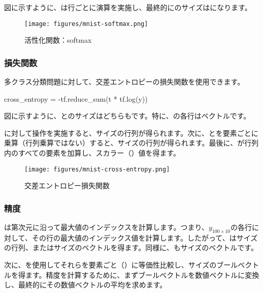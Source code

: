\begin{content}
図に示すように、は行ごとに演算を実施し、最終的にのサイズは\code{[100, 10]}になります。

\begin{figure}[H]
\centering
\texttt{[image: figures/mnist-softmax.png]}
\caption{活性化関数：softmax}
 \label{fig:mnist-softmax}
\end{figure}

\subsubsection{損失関数}

多クラス分類問題に対して、交差エントロピーの損失関数を使用できます。

\begin{leftbar}
\begin{python}
cross_entropy = -tf.reduce_sum(t * tf.log(y))
\end{python}
\end{leftbar}

図に示すように、とのサイズはどちらも\code{[100, 10]}です。特に、の各行はベクトルです。

に対して操作を実施すると、サイズ\code{[100, 10]}の行列が得られます。次に、とを要素ごとに乗算（行列乗算ではない）すると、サイズ\code{[100, 10]}の行列が得られます。最後に、が行列内のすべての要素を加算し、スカラー（）値を得ます。

\begin{figure}[H]
\centering
\texttt{[image: figures/mnist-cross-entropy.png]}
\caption{交差エントロピー損失関数}
 \label{fig:mnist-cross-entropy}
\end{figure}

\subsubsection{精度}

は第次元に沿って最大値のインデックスを計算します。つまり、$ y_{100 \times 10} $の各行に対して、その行の最大値のインデックス値を計算します。したがって、はサイズ\code{[100, 1]}の行列、またはサイズのベクトルを得ます。同様に、もサイズのベクトルです。

次に、を使用してそれらを要素ごと（）に等価性比較し、サイズのブールベクトルを得ます。精度を計算するために、まずブールベクトルを数値ベクトルに変換し、最終的にその数値ベクトルの平均を求めます。


\end{content}
